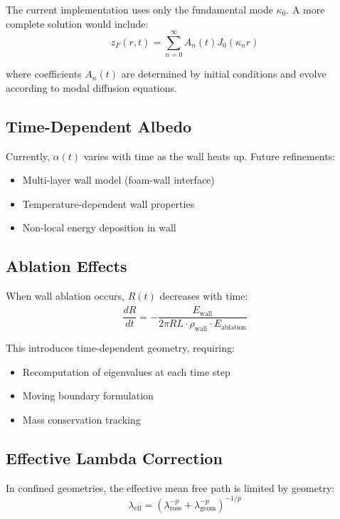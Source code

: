\documentclass[12pt,a4paper]{article}
\begin{document}
The current implementation uses only the fundamental mode $\kappa_0$. A more complete solution would include:
\begin{equation}
z_F(r,t) = \sum_{n=0}^\infty A_n(t) J_0(\kappa_n r)
\end{equation}

where coefficients $A_n(t)$ are determined by initial conditions and evolve according to modal diffusion equations.

\subsection{Time-Dependent Albedo}

Currently, $\alpha(t)$ varies with time as the wall heats up. Future refinements:
\begin{itemize}
    \item Multi-layer wall model (foam-wall interface)
    \item Temperature-dependent wall properties
    \item Non-local energy deposition in wall
\end{itemize}

\subsection{Ablation Effects}

When wall ablation occurs, $R(t)$ decreases with time:
\begin{equation}
\frac{dR}{dt} = -\frac{\dot{E}_{\text{wall}}}{2\pi R L \cdot \rho_{\text{wall}} \cdot E_{\text{ablation}}}
\end{equation}

This introduces time-dependent geometry, requiring:
\begin{itemize}
    \item Recomputation of eigenvalues at each time step
    \item Moving boundary formulation
    \item Mass conservation tracking
\end{itemize}

\subsection{Effective Lambda Correction}

In confined geometries, the effective mean free path is limited by geometry:
\begin{equation}
\lambda_{\text{eff}} = \left(\lambda_{\text{ross}}^{-p} + \lambda_{\text{geom}}^{-p}\right)^{-1/p}
\end{equation}
\end{document}
